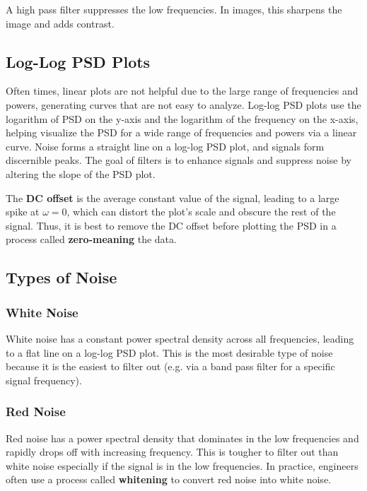 A high pass filter suppresses the low frequencies. In images, this sharpens the image and adds contrast.

\subsection{Log-Log PSD Plots}

Often times, linear plots are not helpful due to the large range of frequencies and powers, generating curves that are not easy to analyze. Log-log PSD plots use the logarithm of PSD on the y-axis and the logarithm of the frequency on the x-axis, helping visualize the PSD for a wide range of frequencies and powers via a linear curve. Noise forms a straight line on a log-log PSD plot, and signals form discernible peaks. The goal of filters is to enhance signals and suppress noise by altering the slope of the PSD plot.

\vsp

The \textbf{DC offset} is the average constant value of the signal, leading to a large spike at $\omega = 0$, which can distort the plot's scale and obscure the rest of the signal. Thus, it is best to remove the DC offset before plotting the PSD in a process called \textbf{zero-meaning} the data.

\subsection{Types of Noise}

\subsubsection{White Noise}

White noise has a constant power spectral density across all frequencies, leading to a flat line on a log-log PSD plot. This is the most desirable type of noise because it is the easiest to filter out (e.g. via a band pass filter for a specific signal frequency).

\subsubsection{Red Noise}

Red noise has a power spectral density that dominates in the low frequencies and rapidly drops off with increasing frequency. This is tougher to filter out than white noise especially if the signal is in the low frequencies. In practice, engineers often use a process called \textbf{whitening} to convert red noise into white noise.

